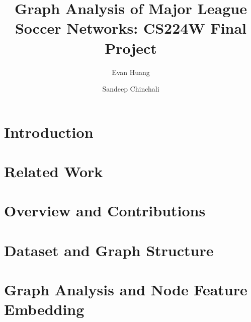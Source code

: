 \documentclass[twoside,twocolumn]{article}
\begin{document}

\title{Graph Analysis of Major League Soccer Networks: CS224W Final Project}
%

\author[1]{Evan Huang}
\author[2]{Sandeep Chinchali}


%
\maketitle

\section{Introduction}
\label{sec:introduction}


\section{Related Work}
\label{sec:related_work}



\section{Overview and Contributions}
\label{sec:outline}


\section{Dataset and Graph Structure}
\label{sec:dataset}


\section{Graph Analysis and Node Feature Embedding}
\label{sec:graph_analysis}

\end{document}
